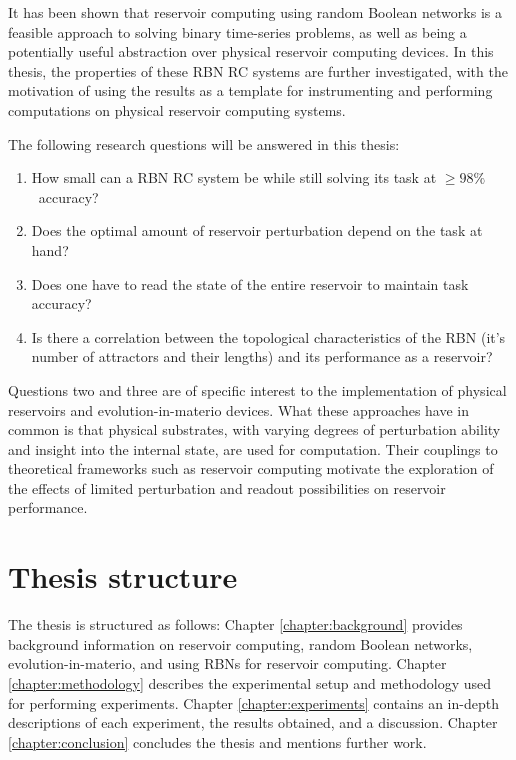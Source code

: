 It has been shown that reservoir computing using random Boolean networks is a feasible approach to solving binary time-series problems,
as well as being a potentially useful abstraction over physical reservoir computing devices.
In this thesis, the properties of these RBN RC systems are further investigated,
with the motivation of using the results as a template for instrumenting and performing computations on physical reservoir computing systems.

The following research questions will be answered in this thesis:
\begin{enumerate}
    \item How small can a RBN RC system be while still solving its task at $ \geq 98\% $ accuracy?
    \item Does the optimal amount of reservoir perturbation depend on the task at hand?
    \item Does one have to read the state of the entire reservoir to maintain task accuracy?
    \item Is there a correlation between the topological characteristics of the RBN (it's number of attractors and their lengths) and its performance as a reservoir?
\end{enumerate}

Questions two and three are of specific interest to the implementation of physical reservoirs and evolution-in-materio devices.
What these approaches have in common is that physical substrates,
with varying degrees of perturbation ability and insight into the internal state,
are used for computation.
Their couplings to theoretical frameworks such as reservoir computing motivate the exploration of the effects of limited perturbation and readout possibilities on reservoir performance.

\section{Thesis structure}

The thesis is structured as follows:
Chapter \ref{chapter:background} provides background information on reservoir computing, random Boolean networks, evolution-in-materio, and using RBNs for reservoir computing.
Chapter \ref{chapter:methodology} describes the experimental setup and methodology used for performing experiments.
Chapter \ref{chapter:experiments} contains an in-depth descriptions of each experiment, the results obtained, and a discussion.
Chapter \ref{chapter:conclusion} concludes the thesis and mentions further work.
